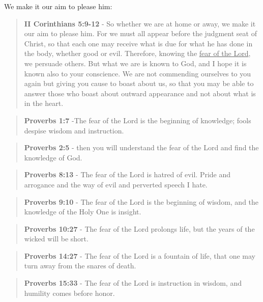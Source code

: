 \documentclass[11pt]{article}
\begin{document}
We make it our aim to please him:

\begin{quote}
\textbf{II Corinthians 5:9-12} - So whether we are at home or away, we make it our aim to please him. For we must all appear before the judgment seat of Christ, so that each one may receive what is due for what he has done in the body, whether good or evil. Therefore, knowing the \uline{fear of the Lord}, we persuade others. But what we are is known to God, and I hope it is known also to your conscience. We are not commending ourselves to you again but giving you cause to boast about us, so that you may be able to answer those who boast about outward appearance and not about what is in the heart.
\end{quote}

\begin{quote}
\textbf{Proverbs 1:7} -The fear of the Lord is the beginning of knowledge; fools despise wisdom and instruction.
\end{quote}

\begin{quote}
\textbf{Proverbs 2:5} - then you will understand the fear of the Lord and find the knowledge of God.
\end{quote}

\begin{quote}
\textbf{Proverbs 8:13} - The fear of the Lord is hatred of evil. Pride and arrogance and the way of evil and perverted speech I hate.
\end{quote}

\begin{quote}
\textbf{Proverbs 9:10} - The fear of the Lord is the beginning of wisdom, and the knowledge of the Holy One is insight.
\end{quote}

\begin{quote}
\textbf{Proverbs 10:27} - The fear of the Lord prolongs life, but the years of the wicked will be short.
\end{quote}

\begin{quote}
\textbf{Proverbs 14:27} - The fear of the Lord is a fountain of life, that one may turn away from the snares of death.
\end{quote}

\begin{quote}
\textbf{Proverbs 15:33} - The fear of the Lord is instruction in wisdom, and humility comes before honor.
\end{quote}
\end{document}

